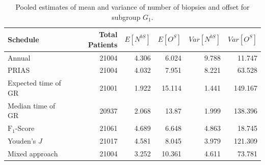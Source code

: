 \begin{table}[!htb]
\centering
\captionsetup{justification=centering}
\caption{Pooled estimates of mean and variance of number of biopsies and offset for subgroup $G_1$.}
\label{table : sim_study_pooled_estimates_G1}
\begin{tabular}{@{}lrrrrr@{}}
\toprule
Schedule           & Total Patients & $E[N^{bS}]$ & $E[O^{S}]$ & $Var[N^{bS}]$ & $Var[O^S]$ \\ \midrule
Annual              & 21004                  & 4.306           & 6.024               & 9.788          & 11.747             \\
PRIAS              & 21004                  & 4.032           & 7.951               & 8.221          & 63.528             \\
Expected time of GR & 21001                  & 1.922           & 15.114              & 1.441          & 149.167            \\
Median time of GR  & 20937                  & 2.068           & 13.87               & 1.999          & 138.396            \\
$\text{F}_1$-Score           & 21061                  & 4.689           & 6.648               & 4.863          & 18.745             \\
Youden's $J$             & 21017                  & 4.581           & 8.045               & 3.979          & 121.309            \\
Mixed approach     & 21004                  & 3.252           & 10.361              & 4.611          & 73.781             \\ \bottomrule
\end{tabular}
\end{table}

